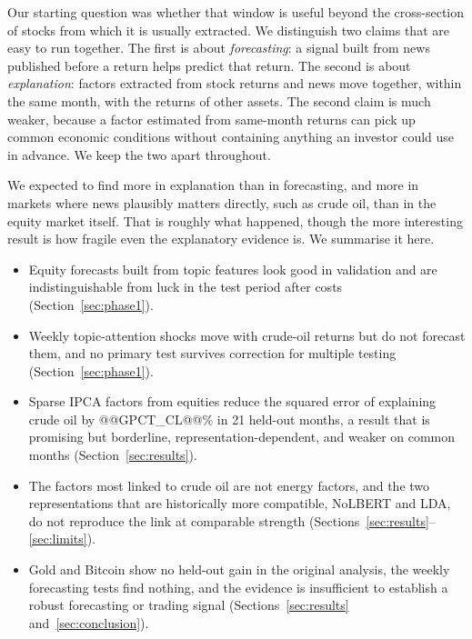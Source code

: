 \documentclass[11pt]{article}
\begin{document}
Our starting question was whether that window is useful beyond the cross-section of stocks from which it is usually extracted. We distinguish two claims that are easy to run together. The first is about \emph{forecasting}: a signal built from news published before a return helps predict that return. The second is about \emph{explanation}: factors extracted from stock returns and news move together, within the same month, with the returns of other assets. The second claim is much weaker, because a factor estimated from same-month returns can pick up common economic conditions without containing anything an investor could use in advance. We keep the two apart throughout.

We expected to find more in explanation than in forecasting, and more in markets where news plausibly matters directly, such as crude oil, than in the equity market itself. That is roughly what happened, though the more interesting result is how fragile even the explanatory evidence is. We summarise it here.

\begin{itemize}
\item Equity forecasts built from topic features look good in validation and are indistinguishable from luck in the test period after costs (Section~\ref{sec:phase1}).
\item Weekly topic-attention shocks move with crude-oil returns but do not forecast them, and no primary test survives correction for multiple testing (Section~\ref{sec:phase1}).
\item Sparse IPCA factors from equities reduce the squared error of explaining crude oil by @@GPCT_CL@@\% in 21 held-out months, a result that is promising but borderline, representation-dependent, and weaker on common months (Section~\ref{sec:results}).
\item The factors most linked to crude oil are not energy factors, and the two representations that are historically more compatible, NoLBERT and LDA, do not reproduce the link at comparable strength (Sections~\ref{sec:results}--\ref{sec:limits}).
\item Gold and Bitcoin show no held-out gain in the original analysis, the weekly forecasting tests find nothing, and the evidence is insufficient to establish a robust forecasting or trading signal (Sections~\ref{sec:results} and~\ref{sec:conclusion}).
\end{itemize}
\end{document}
